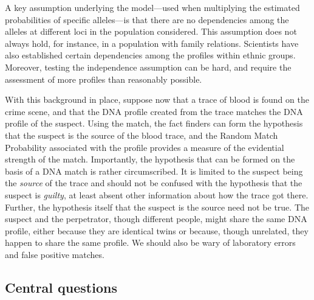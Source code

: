\documentclass[10pt]{article}
\begin{document}
A key assumption underlying the model---used when multiplying the estimated probabilities of specific alleles---is that there are no 
dependencies among the alleles at different loci in the population considered. This assumption does not always hold, for instance, in a population 
with family relations. Scientists have also established certain dependencies among the profiles within ethnic groups. 
Moreover, testing the independence assumption can be hard, and require the assessment of more profiles than reasonably possible. 

With this background in place, suppose now that a trace of blood is found on the crime scene, and that the DNA profile created from the trace matches the DNA profile of the suspect. Using the match, 
the fact finders can form the hypothesis that the suspect is the source of the blood trace, and the Random Match Probability associated with the profile provides 
a measure of the evidential strength of the match. %
Importantly, the hypothesis that can be formed on the basis of a DNA 
match is rather circumscribed. It is limited to the suspect being the \textit{source} of the trace and 
should not be confused with the hypothesis that the suspect is \textit{guilty}, at least 
absent other information about how the trace got there. 
Further, the hypothesis itself that the suspect is the source 
need not be true. The suspect and the perpetrator, though different people, might share 
the same DNA profile, either because they are identical twins or because, though unrelated, 
they happen to share the same profile. We should also be wary 
of laboratory errors and false positive matches. 


\subsection{Central questions}
\end{document}
